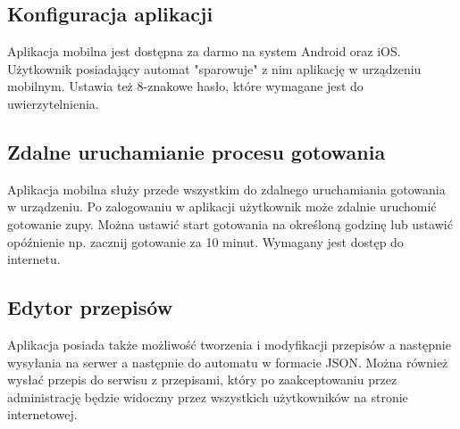 \documentclass[12pt,a4paper,notitlepage]{article}
\begin{document}
\subsection{Konfiguracja aplikacji}
Aplikacja mobilna jest dostępna za darmo na system Android oraz iOS. Użytkownik posiadający automat "sparowuje" z nim aplikację w urządzeniu mobilnym. Ustawia też 8-znakowe hasło, które wymagane jest do uwierzytelnienia.
\subsection{Zdalne uruchamianie procesu gotowania}
Aplikacja mobilna służy przede wszystkim do zdalnego uruchamiania gotowania w urządzeniu. Po zalogowaniu w aplikacji użytkownik może zdalnie uruchomić gotowanie zupy. Można ustawić start gotowania na określoną godzinę lub ustawić opóźnienie np. zacznij gotowanie za 10 minut. Wymagany jest dostęp do internetu.
\subsection{Edytor przepisów}
Aplikacja posiada także możliwość tworzenia i modyfikacji przepisów a następnie wysyłania na serwer a następnie do automatu w formacie JSON. Można również wysłać przepis do serwisu z przepisami, który po zaakceptowaniu przez administrację będzie widoczny przez wszystkich użytkowników na stronie internetowej.
\end{document}
